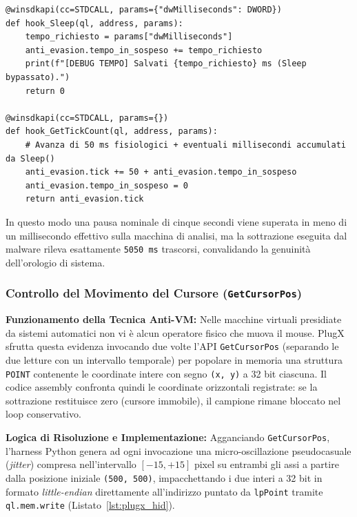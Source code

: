\documentclass[11pt, a4paper]{article}
\begin{document}
\begin{lstlisting}[style=pythoncode, caption={Gestione coerente dell'aritmetica temporale per il bypass dello Sleep-Skipping in PlugX.}, label={lst:plugx_timing}]
@winsdkapi(cc=STDCALL, params={"dwMilliseconds": DWORD})
def hook_Sleep(ql, address, params):
    tempo_richiesto = params["dwMilliseconds"]
    anti_evasion.tempo_in_sospeso += tempo_richiesto
    print(f"[DEBUG TEMPO] Salvati {tempo_richiesto} ms (Sleep bypassato).")
    return 0

@winsdkapi(cc=STDCALL, params={})
def hook_GetTickCount(ql, address, params):
    # Avanza di 50 ms fisiologici + eventuali millisecondi accumulati da Sleep()
    anti_evasion.tick += 50 + anti_evasion.tempo_in_sospeso
    anti_evasion.tempo_in_sospeso = 0
    return anti_evasion.tick
\end{lstlisting}

In questo modo una pausa nominale di cinque secondi viene superata in meno di un millisecondo effettivo sulla macchina di analisi, ma la sottrazione eseguita dal malware rileva esattamente \texttt{5050 ms} trascorsi, convalidando la genuinit\`a dell'orologio di sistema.

\subsubsection{Controllo del Movimento del Cursore (\texttt{GetCursorPos})}

\textbf{Funzionamento della Tecnica Anti-VM:} Nelle macchine virtuali presidiate da sistemi automatici non vi \`e alcun operatore fisico che muova il mouse. PlugX sfrutta questa evidenza invocando due volte l'API \texttt{GetCursorPos} (separando le due letture con un intervallo temporale) per popolare in memoria una struttura \texttt{POINT} contenente le coordinate intere con segno \texttt{(x, y)} a 32 bit ciascuna. Il codice assembly confronta quindi le coordinate orizzontali registrate: se la sottrazione restituisce zero (cursore immobile), il campione rimane bloccato nel loop conservativo.

\textbf{Logica di Risoluzione e Implementazione:} Agganciando \texttt{GetCursorPos}, l'harness Python genera ad ogni invocazione una micro-oscillazione pseudocasuale (\textit{jitter}) compresa nell'intervallo $[-15, +15]$ pixel su entrambi gli assi a partire dalla posizione iniziale \texttt{(500, 500)}, impacchettando i due interi a 32 bit in formato \textit{little-endian} direttamente all'indirizzo puntato da \texttt{lpPoint} tramite \texttt{ql.mem.write} (Listato~\ref{lst:plugx_hid}).
\end{document}
